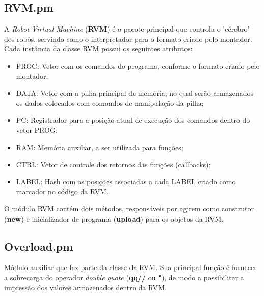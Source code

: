 \documentclass[a4paper]{article}
\begin{document}
    \subsection{RVM.pm}
        
        A \emph{Robot Virtual Machine} (\textbf{RVM}) é o pacote 
        principal que controla o 'cérebro' dos robôs, servindo como o
        interpretador para o formato criado pelo montador. Cada 
        instância da classe RVM possui os seguintes atributos:
        
        \begin{itemize}
            
            \item PROG:  Vetor com os comandos do programa, conforme
                         o formato criado pelo montador;
            \item DATA:  Vetor com a pilha principal de memória, no 
                         qual serão armazenados os dados colocados 
                         com comandos de manipulação da pilha;
            \item PC:    Registrador para a posição atual de execução 
                         dos comandos dentro do vetor PROG;
            \item RAM:   Memória auxiliar, a ser utilizada para funções;
            \item CTRL:  Vetor de controle dos retornos das funções 
                         (callbacks);
            \item LABEL: Hash com as posições associadas a cada LABEL
                         criado como marcador no código da RVM.
            
        \end{itemize}
        
        O módulo RVM contém dois métodos, responsáveis por agirem como
        construtor (\textbf{new}) e inicializador de programa 
        (\textbf{upload}) para os objetos da RVM.
        
    \subsection{Overload.pm}
        
        Módulo auxiliar que faz parte da classe da RVM. Sua principal
        função é fornecer a sobrecarga do operador \emph{double quote}
        (\textbf{qq//} ou \textbf{"}), de modo a possibilitar a 
        impressão dos valores armazenados dentro da RVM.
    
\end{document}
